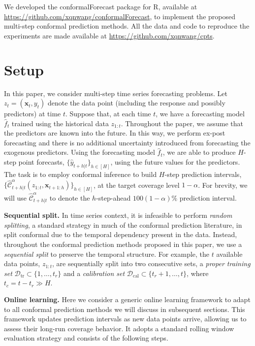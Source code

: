 \documentclass[
  11pt,
  a4paper,
]{article}
\theoremstyle{plain}
\theoremstyle{remark}
\begin{document}
We developed the conformalForecast package for R, available at
\url{https://github.com/xqnwang/conformalForecast}, to implement the
proposed multi-step conformal prediction methods. All the data and code
to reproduce the experiments are made available at
\url{https://github.com/xqnwang/cpts}.

\section{Setup}\label{sec-setup}

In this paper, we consider multi-step time series forecasting problems.
Let \(z_t = (\bm{x}_t, y_t)\) denote the data point (including the
response and possibly predictors) at time \(t\). Suppose that, at each
time \(t\), we have a forecasting model \(\hat{f}_t\) trained using the
historical data \(z_{1:t}\). Throughout the paper, we assume that the
predictors are known into the future. In this way, we perform ex-post
forecasting and there is no additional uncertainty introduced from
forecasting the exogenous predictors. Using the forecasting model
\(\hat{f}_t\), we are able to produce \(H\)-step point forecasts,
\(\{\hat{y}_{t+h|t}\}_{h\in[H]}\), using the future values for the
predictors. The task is to employ conformal inference to build
\(H\)-step prediction intervals,
\(\{\hat{\mathcal{C}}_{t+h|t}^{\alpha}\left(z_{1:t},\bm{x}_{t+1:h}\right)\}_{h\in[H]}\),
at the target coverage level \(1-\alpha\). For brevity, we will use
\(\hat{\mathcal{C}}_{t+h|t}^{\alpha}\) to denote the \(h\)-step-ahead
\(100(1-\alpha)\%\) prediction interval.

\textbf{Sequential split.} In time series context, it is infeasible to
perform \emph{random splitting}, a standard strategy in much of the
conformal prediction literature, in split conformal due to the temporal
dependency present in the data. Instead, throughout the conformal
prediction methods proposed in this paper, we use a \emph{sequential
split} to preserve the temporal structure. For example, the \(t\)
available data points, \(z_{1:t}\), are sequentially split into two
consecutive sets, a \emph{proper training set}
\(\mathcal{D}_{\text{tr}} \subset \{1,\ldots,t_r\}\) and a
\emph{calibration set}
\(\mathcal{D}_{\text{cal}} \subset \{t_r+1,\ldots,t\}\), where
\(t_c=t-t_r \gg H\).

\textbf{Online learning.} Here we consider a generic online learning
framework to adapt to all conformal prediction methods we will discuss
in subsequent sections. This framework updates prediction intervals as
new data points arrive, allowing us to assess their long-run coverage
behavior. It adopts a standard rolling window evaluation strategy and
consists of the following steps.
\end{document}
